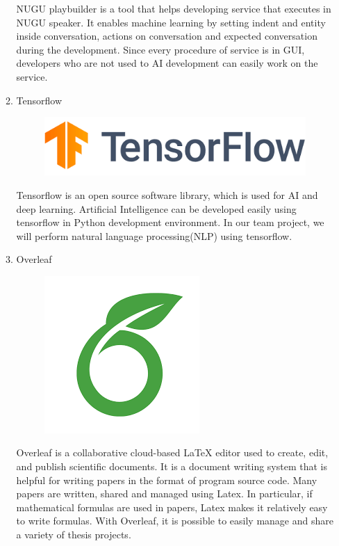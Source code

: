 \documentclass[conference]{IEEEtran}
\begin{document}
\begin{enumerate}
\begin{enumerate}
\begin{figure}[H]
                 \end{figure}
        NUGU playbuilder is a tool that helps developing service that executes in NUGU speaker. It enables machine learning by setting indent and entity inside conversation, actions on conversation and expected conversation during the development. Since every procedure of service is in GUI, developers who are not used to AI development can easily work on the service.
        \item Tensorflow\\
        \begin{figure}[H]
                 \centering
                 \includegraphics[scale=0.2]{new_assets/tensorflow-logo.png}
                 \end{figure}
        Tensorflow is an open source software library, which is used for AI and deep learning. Artificial Intelligence can be developed easily using tensorflow in Python development environment. In our team project, we will perform natural language processing(NLP) using tensorflow.
        \item Overleaf\\
        \begin{figure}[H]
                 \centering
                 \includegraphics[scale=0.3]{new_assets/overleaf-logo.png}
                 \end{figure}
        Overleaf is a collaborative cloud-based LaTeX editor used to create, edit, and publish scientific documents. It is a document writing system that is helpful for writing papers in the format of program source code. Many papers are written, shared and managed using Latex. In particular, if mathematical formulas are used in papers, Latex makes it relatively easy to write formulas. With Overleaf, it is possible to easily manage and share a variety of thesis projects.

\end{enumerate}
\end{enumerate}
\end{document}
